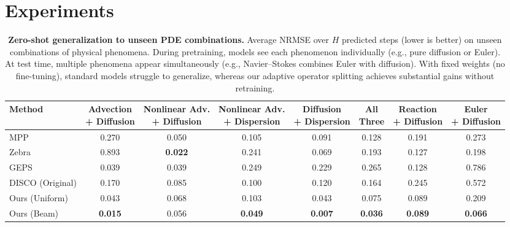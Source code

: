 \documentclass{article}
\theoremstyle{plain}
\theoremstyle{definition}
\theoremstyle{remark}
\begin{document}
\section{Experiments}
\begin{table}[t]
\setlength{\tabcolsep}{2.5pt}
\centering
\caption{
\textbf{Zero-shot generalization to unseen PDE combinations.} Average NRMSE over $H$ predicted steps (lower is better) on unseen combinations of physical phenomena. During pretraining, models see each phenomenon individually (e.g., pure diffusion or Euler). At test time, multiple phenomena appear simultaneously (e.g., Navier--Stokes combines Euler with diffusion). With fixed weights (no fine-tuning), standard models struggle to generalize, whereas our adaptive operator splitting achieves substantial gains without retraining.
}
\label{tab:composition_results}
\begin{tabular}{@{}lc|cccc|c|c@{}}
\toprule
\textbf{Method} & \makecell{\textbf{Advection}\\\textbf{+ Diffusion}} & \makecell{\textbf{Nonlinear Adv.}\\\textbf{+ Diffusion}} & \makecell{\textbf{Nonlinear Adv.}\\\textbf{+ Dispersion}} & \makecell{\textbf{Diffusion}\\\textbf{+ Dispersion}} & \makecell{\textbf{All}\\\textbf{Three}} & \makecell{\textbf{Reaction}\\\textbf{+ Diffusion}} & \makecell{\textbf{Euler}\\\textbf{+ Diffusion}} \\
\midrule
MPP & 0.270 & 0.050 & 0.105 & 0.091 & 0.128 & 0.191 & 0.273 \\
Zebra & 0.893 & \textbf{0.022} & 0.241 & 0.069 & 0.193 & 0.127 & 0.198\\
GEPS & 0.039 & 0.039 & 0.249 & 0.229 & 0.265 & 0.128 & 0.786 \\
DISCO (Original) & 0.170 & 0.085 & 0.100 & 0.120 & 0.164 & 0.245 & 0.572\\
\midrule
Ours (Uniform) & 0.043 & 0.068 & 0.103 & 0.043 & 0.075 & 0.089 & 0.209 \\
Ours (Beam) & \textbf{0.015} & 0.056 & \textbf{0.049} & \textbf{0.007} & \textbf{0.036} & \textbf{0.089} & \textbf{0.066} \\
\bottomrule
\end{tabular}
\end{table}
\end{document}
